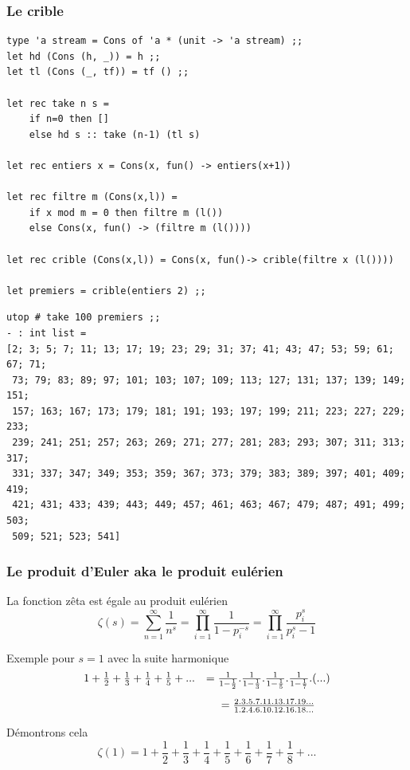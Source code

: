 \documentclass[11pt]{book}
\begin{document}
\subsubsection{Le crible}
\begin{Verbatim}
type 'a stream = Cons of 'a * (unit -> 'a stream) ;;
let hd (Cons (h, _)) = h ;;
let tl (Cons (_, tf)) = tf () ;;

let rec take n s =
	if n=0 then []
	else hd s :: take (n-1) (tl s) 

let rec entiers x = Cons(x, fun() -> entiers(x+1)) 

let rec filtre m (Cons(x,l)) =
	if x mod m = 0 then filtre m (l()) 
	else Cons(x, fun() -> (filtre m (l()))) 

let rec crible (Cons(x,l)) = Cons(x, fun()-> crible(filtre x (l())))

let premiers = crible(entiers 2) ;;
\end{Verbatim}
\begin{Verbatim}
utop # take 100 premiers ;;
- : int list =
[2; 3; 5; 7; 11; 13; 17; 19; 23; 29; 31; 37; 41; 43; 47; 53; 59; 61; 67; 71;
 73; 79; 83; 89; 97; 101; 103; 107; 109; 113; 127; 131; 137; 139; 149; 151;
 157; 163; 167; 173; 179; 181; 191; 193; 197; 199; 211; 223; 227; 229; 233;
 239; 241; 251; 257; 263; 269; 271; 277; 281; 283; 293; 307; 311; 313; 317;
 331; 337; 347; 349; 353; 359; 367; 373; 379; 383; 389; 397; 401; 409; 419;
 421; 431; 433; 439; 443; 449; 457; 461; 463; 467; 479; 487; 491; 499; 503;
 509; 521; 523; 541]
\end{Verbatim}

\subsubsection{Le produit d'Euler aka le produit eulérien}
La fonction zêta est égale au produit eulérien
\[ \zeta(s) = \sum_{n=1}^{\infty} \frac{1}{n^s} = \prod_{i=1}^\infty \frac{1}{1-p_i^{-s}} = \prod_{i=1}^\infty \frac{p_i^s}{p_i^s-1} \]

Exemple pour $s=1$ avec la suite harmonique
$$
\begin{array}{ccc}
1+ \frac{1}{2} + \frac{1}{3} + \frac{1}{4} + \frac{1}{5} +...  &=  \frac{1}{1-\frac{1}{2}} .\frac{1}{1-\frac{1}{3}}.\frac{1}{1-\frac{1}{5}}.\frac{1}{1-\frac{1}{7}}. (...) \\[\bigskipamount]
&= \frac{2.3.5.7.11.13.17.19...}{1.2.4.6.10.12.16.18...} 
\end{array}
$$

Démontrons cela
\[\zeta(1) = 1+ \frac{1}{2} + \frac{1}{3} + \frac{1}{4} + \frac{1}{5}+ \frac{1}{6}+ \frac{1}{7} +  \frac{1}{8} +... \]
\end{document}
